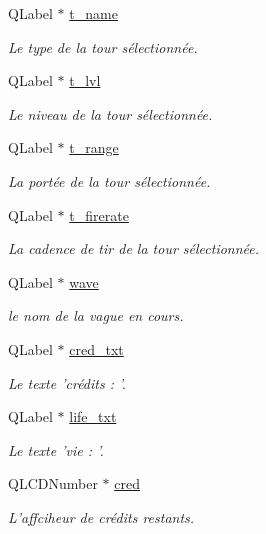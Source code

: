 \begin{DoxyCompactItemize}
QLabel $\ast$ \hyperlink{classUI_a161fc86882aacdd0577fc8e65ae7b9a5}{t\_\-name}
\begin{DoxyCompactList}\small\item\em Le type de la tour sélectionnée. \end{DoxyCompactList}\item 
QLabel $\ast$ \hyperlink{classUI_ad249255ec54bc26253e0c215852a8eac}{t\_\-lvl}
\begin{DoxyCompactList}\small\item\em Le niveau de la tour sélectionnée. \end{DoxyCompactList}\item 
QLabel $\ast$ \hyperlink{classUI_a46e8137a64e79962e0ba633d4feb341f}{t\_\-range}
\begin{DoxyCompactList}\small\item\em La portée de la tour sélectionnée. \end{DoxyCompactList}\item 
QLabel $\ast$ \hyperlink{classUI_aad8e7e7def9708c2b6e6511abb548b6d}{t\_\-firerate}
\begin{DoxyCompactList}\small\item\em La cadence de tir de la tour sélectionnée. \end{DoxyCompactList}\item 
QLabel $\ast$ \hyperlink{classUI_a3f735d7d737b15dad131baf43b58eb17}{wave}
\begin{DoxyCompactList}\small\item\em le nom de la vague en cours. \end{DoxyCompactList}\item 
QLabel $\ast$ \hyperlink{classUI_a931c707005030131187d786b0966fc22}{cred\_\-txt}
\begin{DoxyCompactList}\small\item\em Le texte 'crédits : '. \end{DoxyCompactList}\item 
QLabel $\ast$ \hyperlink{classUI_a2f7c3ea7fc4e840270e989b0e68ec82b}{life\_\-txt}
\begin{DoxyCompactList}\small\item\em Le texte 'vie : '. \end{DoxyCompactList}\item 
QLCDNumber $\ast$ \hyperlink{classUI_a1e6f0b63d2e4cb88476541452f81bd64}{cred}
\begin{DoxyCompactList}\small\item\em L'affciheur de crédits restants. \end{DoxyCompactList}\item 

\end{DoxyCompactItemize}

